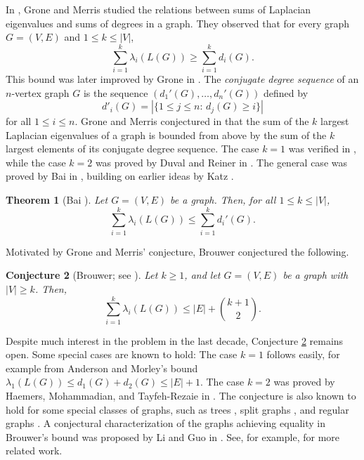 \documentclass[a4paper,11pt]{article}
\theoremstyle{plain}
\newtheorem{theorem}{\bf Theorem}
\newtheorem{conjecture}[theorem]{\bf Conjecture}
\theoremstyle{definition}
\numberwithin{theorem}{section}
\numberwithin{equation}{section}
\begin{document}
In \cite{grone1994laplacian}, Grone and Merris studied the relations between sums of Laplacian eigenvalues and sums of degrees in a graph. They observed that for every graph $G=(V,E)$ and $1\le k\le |V|$, 
\[
    \sum_{i=1}^k \lambda_i(L(G)) \ge \sum_{i=1}^k d_i(G).
\]
This bound was later improved by Grone in \cite{grone1995eigenvalues}. 
The \emph{conjugate degree sequence} of an $n$-vertex graph $G$ is the sequence $(d_1'(G),\ldots,d_{n}'(G))$ defined by
\[
    d'_i(G)= \left| \{ 1\le j\le n:\, d_j(G)\ge i\}\right|
\]
for all $1\le i\le n$. Grone and Merris conjectured in \cite{grone1994laplacian} that the sum of the $k$ largest Laplacian eigenvalues of a graph is bounded from above by the sum of the $k$ largest elements of its conjugate degree sequence. The case $k=1$ was verified in \cite{grone1994laplacian}, while the case $k=2$ was proved by Duval and Reiner in \cite{duval2002shifted}. The general case was proved by Bai in \cite{bai2011gronemerris}, building on earlier ideas by Katz \cite{katz2005grone}.

\begin{theorem}[Bai \cite{bai2011gronemerris}]\label{thm:bai}
Let $G=(V,E)$ be a graph. Then, for all $1\le k\le |V|$,
\[ 
    \sum_{i=1}^k \lambda_i(L(G))\le \sum_{i=1}^k d_i'(G).
\]
\end{theorem}

Motivated by Grone and Merris' conjecture, Brouwer conjectured the following.

\begin{conjecture}[Brouwer; see \cite{haemers2010onthesum,brouwer2012book}]\label{conj:brouwer}
    Let $k\ge 1$, and let $G=(V,E)$ be a graph with $|V|\ge k$. Then,
\[
    \sum_{i=1}^k \lambda_i(L(G))\le |E| + \binom{k+1}{2}.
\]
\end{conjecture}

Despite much interest in the problem in the last decade, Conjecture \ref{conj:brouwer} remains open. Some special cases are known to hold: The case $k=1$ follows easily, for example from Anderson and Morley's bound $\lambda_1(L(G))\le d_1(G)+d_2(G)\le |E|+1$. The case $k=2$ was proved by Haemers, Mohammadian, and Tayfeh-Rezaie in \cite{haemers2010onthesum}. The conjecture is also known to hold for some special classes of graphs, such as trees \cite{haemers2010onthesum}, split graphs \cite{berndsen2010thesis, mayard2010thesis}, and regular graphs \cite{berndsen2010thesis,mayard2010thesis}. A conjectural characterization of the graphs achieving equality in Brouwer's bound was proposed by Li and Guo in \cite{li2022full}. See, for example, \cite{chen2018note,chen2019onbrouwers, chen2025more, cooper2021constraints,du2012upper,fritscher2011onthesum, ganie2020further, guan2014onthesum, rocha2020aas, torres2024brouwer ,helmberg2017spectral} for more related work.
\end{document}
